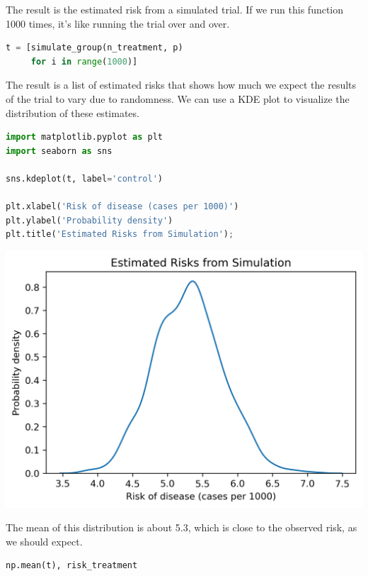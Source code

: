 The result is the estimated risk from a simulated trial. If we run this
function 1000 times, it's like running the trial over and over.

\begin{lstlisting}[language=Python,style=source]
t = [simulate_group(n_treatment, p)
     for i in range(1000)]
\end{lstlisting}

The result is a list of estimated risks that shows how much we expect
the results of the trial to vary due to randomness. We can use a KDE
plot to visualize the distribution of these estimates.

\begin{lstlisting}[language=Python,style=source]
import matplotlib.pyplot as plt
import seaborn as sns

sns.kdeplot(t, label='control')

plt.xlabel('Risk of disease (cases per 1000)')
plt.ylabel('Probability density')
plt.title('Estimated Risks from Simulation');
\end{lstlisting}

\begin{center}
\includegraphics[scale=0.75]{11_resampling_files/11_resampling_30_0.png}
\end{center}

The mean of this distribution is about 5.3, which is close to the
observed risk, as we should expect.

\begin{lstlisting}[language=Python,style=source]
np.mean(t), risk_treatment
\end{lstlisting}

